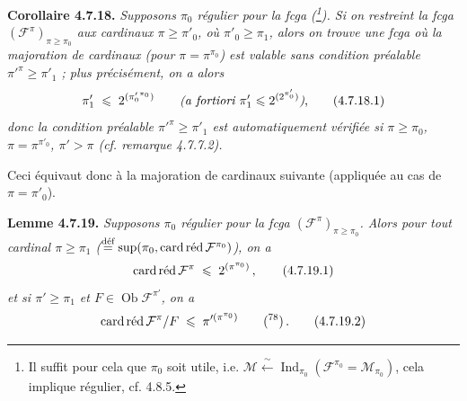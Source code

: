 \documentclass[11pt]{article}
\newcommand{\printedpage}[1]{\marginpar{\footnotesize p.~#1}}
\newcommand{\Ob}{\operatorname{Ob}}
\newcommand{\Ind}{\operatorname{Ind}}
\newcommand{\cardred}{\mathop{\mathrm{card}\,\textup{réd}}\nolimits}
\begin{document}
\noindent\printedpage{63}
\textbf{Corollaire 4.7.18.} \textit{Supposons $\pi_0$ régulier pour la fcga (\footnote[77]{Il suffit pour cela que $\pi_0$ soit utile, i.e. $\mathcal{M}\xleftarrow{\ \sim\ }\Ind_{\pi_0}(\mathcal{F}^{\pi_0}=\mathcal{M}_{\pi_0})$, cela implique régulier, cf. 4.8.5.}). Si on restreint la fcga $(\mathcal{F}^{\pi})_{\pi\geqslant\pi_0}$ aux cardinaux $\pi\geqslant\pi'_0$, où $\pi'_0\geqslant\pi_1$, alors on trouve une fcga où la majoration de cardinaux (pour $\pi=\pi^{\pi_0}$) est valable sans condition préalable $\pi'^{\pi}\geqslant\pi'_1$ ; plus précisément, on a alors}
\[
\pi'_1 \;\leqslant\; 2^{({\pi'_0}^{\pi_0})} \qquad \text{\textit{(a fortiori $\pi'_1\leqslant 2^{(2^{\pi'_0})}$)},} \tag*{(4.7.18.1)}
\]
\textit{donc la condition préalable $\pi'^{\pi}\geqslant\pi'_1$ est automatiquement vérifiée si $\pi\geqslant\pi_0$, $\pi=\pi^{\pi'_0}$, $\pi'>\pi$ (cf. remarque 4.7.7.2).}

Ceci équivaut donc à la majoration de cardinaux suivante (appliquée au cas de $\pi=\pi'_0$).

\textbf{Lemme 4.7.19.} \textit{Supposons $\pi_0$ régulier pour la fcga $(\mathcal{F}^{\pi})_{\pi\geqslant\pi_0}$. Alors pour tout cardinal $\pi\geqslant\pi_1$ ($\overset{\text{déf}}{=}\sup(\pi_0,\cardred\mathcal{F}^{\pi_0})$), on a}
\[
\cardred\mathcal{F}^{\pi} \;\leqslant\; 2^{(\pi^{\pi_0})} \, , \tag*{(4.7.19.1)}
\]
\textit{et si $\pi'\geqslant\pi_1$ et $F\in\Ob\mathcal{F}^{\pi'}$, on a}
\[
\cardred\mathcal{F}^{\pi}/F \;\leqslant\; \pi'^{(\pi^{\pi_0})} \qquad \text{(\footnotemark[78])} \, . \tag*{(4.7.19.2)}
\]
\end{document}
